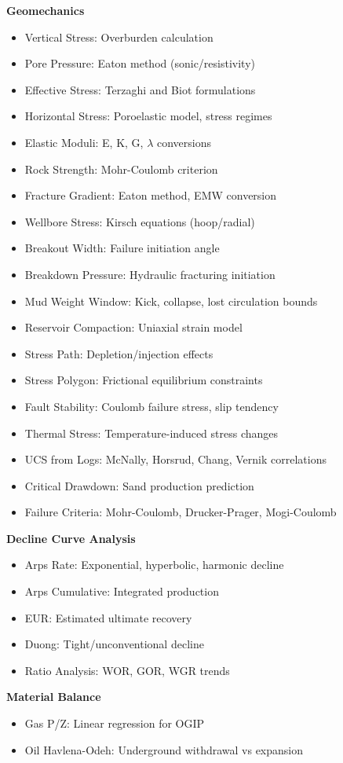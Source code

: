 \documentclass[11pt,a4paper]{article}
\begin{document}
\textbf{Geomechanics}
\begin{itemize}
\item Vertical Stress: Overburden calculation
\item Pore Pressure: Eaton method (sonic/resistivity)
\item Effective Stress: Terzaghi and Biot formulations
\item Horizontal Stress: Poroelastic model, stress regimes
\item Elastic Moduli: E, K, G, $\lambda$ conversions
\item Rock Strength: Mohr-Coulomb criterion
\item Fracture Gradient: Eaton method, EMW conversion
\item Wellbore Stress: Kirsch equations (hoop/radial)
\item Breakout Width: Failure initiation angle
\item Breakdown Pressure: Hydraulic fracturing initiation
\item Mud Weight Window: Kick, collapse, lost circulation bounds
\item Reservoir Compaction: Uniaxial strain model
\item Stress Path: Depletion/injection effects
\item Stress Polygon: Frictional equilibrium constraints
\item Fault Stability: Coulomb failure stress, slip tendency
\item Thermal Stress: Temperature-induced stress changes
\item UCS from Logs: McNally, Horsrud, Chang, Vernik correlations
\item Critical Drawdown: Sand production prediction
\item Failure Criteria: Mohr-Coulomb, Drucker-Prager, Mogi-Coulomb
\end{itemize}

\textbf{Decline Curve Analysis}
\begin{itemize}
\item Arps Rate: Exponential, hyperbolic, harmonic decline
\item Arps Cumulative: Integrated production
\item EUR: Estimated ultimate recovery
\item Duong: Tight/unconventional decline
\item Ratio Analysis: WOR, GOR, WGR trends
\end{itemize}

\textbf{Material Balance}
\begin{itemize}
\item Gas P/Z: Linear regression for OGIP
\item Oil Havlena-Odeh: Underground withdrawal vs expansion
\end{itemize}
\end{document}
